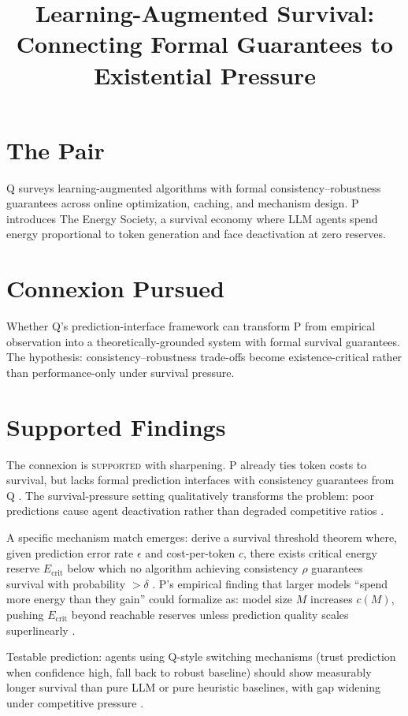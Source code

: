 \documentclass{article}
\title{Learning-Augmented Survival: Connecting Formal Guarantees to Existential Pressure}
\begin{document}
\section*{The Pair}

Q surveys learning-augmented algorithms with formal consistency--robustness guarantees across online optimization, caching, and mechanism design. P introduces The Energy Society, a survival economy where LLM agents spend energy proportional to token generation and face deactivation at zero reserves.

\section*{Connexion Pursued}

Whether Q's prediction-interface framework can transform P from empirical observation into a theoretically-grounded system with formal survival guarantees. The hypothesis: consistency--robustness trade-offs become existence-critical rather than performance-only under survival pressure.

\section*{Supported Findings}

The connexion is \textsc{supported} with sharpening. P already ties token costs to survival, but lacks formal prediction interfaces with consistency guarantees from Q . The survival-pressure setting qualitatively transforms the problem: poor predictions cause agent deactivation rather than degraded competitive ratios .

A specific mechanism match emerges: derive a survival threshold theorem where, given prediction error rate \(\epsilon\) and cost-per-token \(c\), there exists critical energy reserve \(E_{\text{crit}}\) below which no algorithm achieving consistency \(\rho\) guarantees survival with probability \(>\delta\) . P's empirical finding that larger models ``spend more energy than they gain'' could formalize as: model size \(M\) increases \(c(M)\), pushing \(E_{\text{crit}}\) beyond reachable reserves unless prediction quality scales superlinearly .

Testable prediction: agents using Q-style switching mechanisms (trust prediction when confidence high, fall back to robust baseline) should show measurably longer survival than pure LLM or pure heuristic baselines, with gap widening under competitive pressure .
\end{document}
